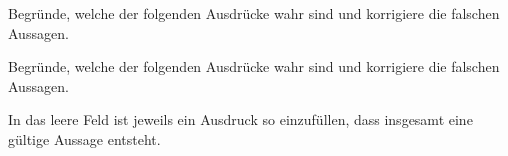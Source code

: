 \documentclass[11pt]{exam}
\begin{document}
\begin{questions}
\question[4]
Begründe, welche der folgenden Ausdrücke wahr sind und korrigiere die falschen Aussagen.

\question[4]
Begründe, welche der folgenden Ausdrücke wahr sind und korrigiere die falschen Aussagen.

\question[4]
In das leere Feld ist jeweils ein Ausdruck so einzufüllen, dass insgesamt eine gültige Aussage entsteht.
\end{questions}
\end{document}
